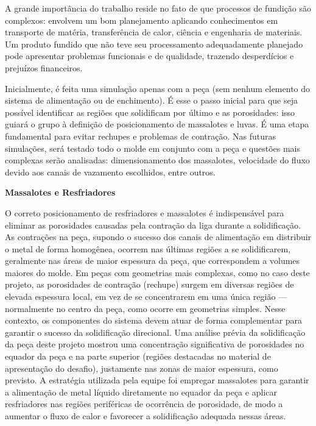 \documentclass[12pt, a4]{article}
\begin{document}
A grande importância do trabalho reside no fato de que processos de fundição são complexos: envolvem um bom planejamento aplicando conhecimentos em transporte de matéria, transferência de calor, ciência e engenharia de materiais. Um produto fundido que não teve seu processamento adequadamente planejado pode apresentar problemas funcionais e de qualidade, trazendo desperdícios e prejuízos financeiros.

 Inicialmente, é feita uma simulação apenas com a peça (sem nenhum elemento do sistema de alimentação ou de enchimento). É esse o passo inicial para que seja possível identificar as regiões que solidificam por último e as porosidades: isso guiará o grupo à definição de posicionamento de massalotes e luvas. É uma etapa fundamental para evitar rechupes e problemas de contração. Nas futuras simulações, será testado todo o molde em conjunto com a peça e questões mais complexas serão analisadas: dimensionamento dos massalotes, velocidade do fluxo devido aos canais de vazamento escolhidos, entre outros. 


\begin{flushleft}
    \textbf{Massalotes e Resfriadores}
\end{flushleft}

O correto posicionamento de resfriadores e massalotes é indispensável para eliminar as porosidades causadas pela contração da liga durante a solidificação. As contrações na peça, supondo o sucesso dos canais de alimentação em distribuir o metal de forma homogênea, ocorrem nas últimas regiões a se solidificarem, geralmente nas áreas de maior espessura da peça, que correspondem a volumes maiores do molde. Em peças com geometrias mais complexas, como no caso deste projeto, as porosidades de contração (rechupe) surgem em diversas regiões de elevada espessura local, em vez de se concentrarem em uma única região — normalmente no centro da peça, como ocorre em geometrias simples. Nesse contexto, os componentes do sistema devem atuar de forma complementar para garantir o sucesso da solidificação direcional.
Uma análise prévia da solidificação da peça deste projeto mostrou uma concentração significativa de porosidades no equador da peça e na parte superior (regiões destacadas no material de apresentação do desafio), justamente nas zonas de maior espessura, como previsto. A estratégia utilizada pela equipe foi empregar massalotes para garantir a alimentação de metal líquido diretamente no equador da peça e aplicar resfriadores nas regiões periféricas de ocorrência de porosidade, de modo a aumentar o fluxo de calor e favorecer a solidificação adequada nessas áreas.
\end{document}

